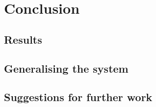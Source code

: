 \chapter{Conclusion}

\label{Chapter6}



\section{Results} %
\label{sec:results}


\section{Generalising the system} %
\label{sec:generalising_the_system}


\section{Suggestions for further work} %
\label{sec:suggestions_for_further_work}

